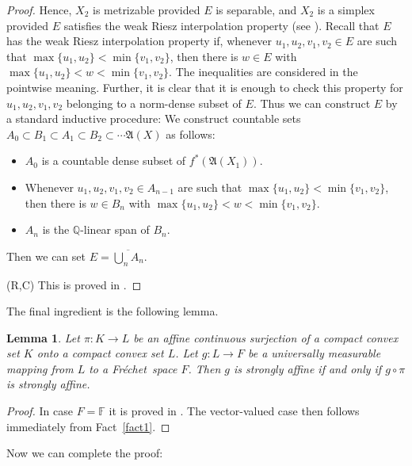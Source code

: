 \documentclass{amsart}
\numberwithin{equation}{section}
\newtheorem{lemma}[thm]{Lemma}
\theoremstyle{definition}
\def\fra{\mathfrak{A}}
\def\ef{\mathbb F}
\def\qe{\mathbb Q}
\def\ov{\overline}
\newcommand{\fr}{Fr\'echet\ }
\begin{document}
\begin{proof}
Hence, $X_2$ is metrizable provided $E$ is separable, and $X_2$ is a simplex provided $E$ satisfies the weak Riesz interpolation property
(see \cite[Corollary II.3.11]{alfsen}). Recall that $E$ has the weak Riesz interpolation property if, whenever $u_1,u_2,v_1,v_2 \in E$ are such that
$\max\{u_1,u_2\}<\min\{v_1,v_2\}$, then there is $w\in E$ with $\max\{u_1,u_2\}<w<\min\{v_1,v_2\}$. The inequalities are considered in the pointwise meaning. Further, it is clear that it is enough to check this property for $u_1,u_2,v_1,v_2$ belonging to a norm-dense subset of $E$. Thus we can construct $E$ by a standard inductive procedure: We construct countable sets $A_0\subset B_1\subset A_1\subset B_2\subset\cdots \fra(X)$ as follows:
\begin{itemize}
	\item $A_0$ is a countable dense subset of $f^*(\fra(X_1))$.
	\item Whenever $u_1,u_2,v_1,v_2 \in A_{n-1}$ are such that
$\max\{u_1,u_2\}<\min\{v_1,v_2\}$, then there is $w\in B_n$ with $\max\{u_1,u_2\}<w<\min\{v_1,v_2\}$.
\item $A_n$ is the $\qe$-linear span of $B_n$.
\end{itemize}
Then we can set $E=\ov{\bigcup_n A_n}$.


(R,C) This is proved in \cite[\S23, Lemma 1]{lacey}.
\end{proof}

The final ingredient is the following lemma.

\begin{lemma}
\label{perfectaff}
Let $\pi\colon K\to L$ be an affine continuous surjection of a compact convex set $K$ onto a compact convex set $L$. Let $g\colon L\to F$ be a universally measurable mapping from $L$ to a \fr space $F$. Then $g$ is strongly affine if
and only if $g\circ \pi$ is strongly affine.
\end{lemma}

\begin{proof} In case $F=\ef$ it is proved in \cite[Proposition 5.29]{lmns}. The vector-valued case then follows immediately from Fact~\ref{fact1}.
\end{proof}

Now we can  complete  the proof:
\end{document}
